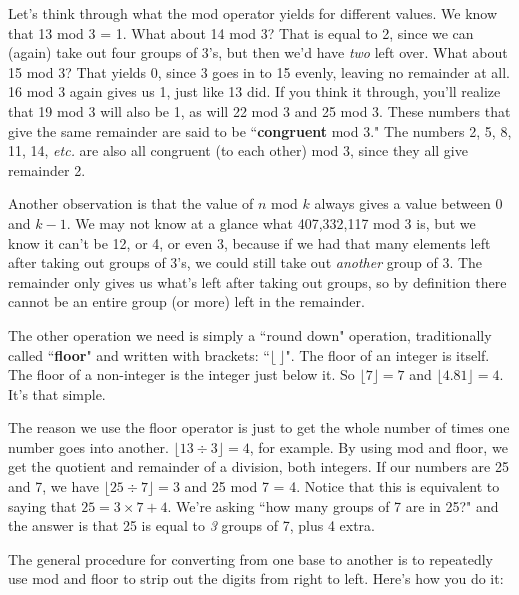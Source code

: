 Let's think through what the mod operator yields for different values. We
know that 13 mod 3 = 1. What about 14 mod 3? That is equal to 2, since we
can (again) take out four groups of 3's, but then we'd have \textit{two}
left over. What about 15 mod 3? That yields 0, since 3 goes in to 15
evenly, leaving no remainder at all. 16 mod 3 again gives us 1, just like
13 did.  If you think it through, you'll realize that 19 mod 3 will also be
1, as will 22 mod 3 and 25 mod 3. These numbers that give the same
remainder are said to be ``\textbf{congruent} mod 3." The numbers 2, 5, 8,
11, 14, \textit{etc.} are also all congruent (to each other) mod 3, since
they all give remainder 2.

Another observation is that the value of $n$ mod $k$ always gives a value
between 0 and $k-1$. We may not know at a glance what 407,332,117 mod 3 is,
but we know it can't be 12, or 4, or even 3, because if we had that many
elements left after taking out groups of 3's, we could still take out
\textit{another} group of 3. The remainder only gives us what's left after
taking out groups, so by definition there cannot be an entire group (or
more) left in the remainder.

The other operation we need is simply a ``round down" operation,
traditionally called ``\textbf{floor}" and written with brackets:
``$\lfloor \ \rfloor$". The floor of an integer is itself. The floor of a
non-integer is the integer just below it. So $\lfloor 7 \rfloor = 7$ and
$\lfloor 4.81 \rfloor = 4$. It's that simple.

The reason we use the floor operator is just to get the whole number of
times one number goes into another. $\lfloor 13 \div 3 \rfloor = 4$, for
example. By using mod and floor, we get the quotient and remainder of a
division, both integers. If our numbers are 25 and 7, we have $\lfloor 25
\div 7 \rfloor = 3$ and 25 mod 7 = 4. Notice that this is equivalent to
saying that $25 = 3 \times 7 + 4$. We're asking ``how many groups of 7 are
in 25?" and the answer is that 25 is equal to \textit{3} groups of 7, plus
4 extra.

The general procedure for converting from one base to another is to
repeatedly use mod and floor to strip out the digits from right to left. 
Here's how you do it:

